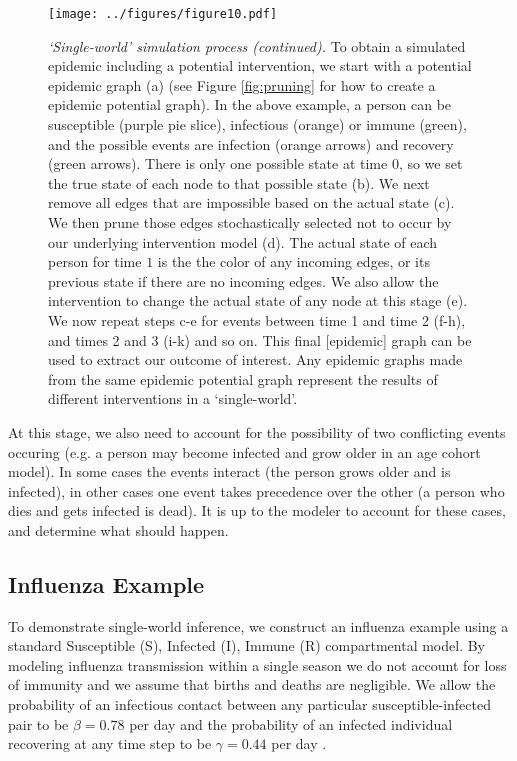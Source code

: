 \documentclass[PTRSB]{rsos}
\makeatletter
\def\checkGraphicsWidth{\ifdim\Gin@nat@width>\linewidth
	\tsGraphicsScaleX\linewidth\else\Gin@nat@width\fi}
\let\ts@includegraphics\includegraphics
\renewcommand{\includegraphics}[1]{\ts@includegraphics[width=\checkGraphicsWidth]{#1}}
\makeatother
\begin{document}
\begin{multicols}{2}
\begin{figure}[hp]
\texttt{[image: ../figures/figure10.pdf]}
\caption{\textit{‘Single-world’ simulation process (continued).}
  To obtain a simulated epidemic including a potential intervention, we start with a potential epidemic graph (a) (see Figure \ref{fig:pruning} for how to create a epidemic potential graph).
  In the above example, a person can be susceptible (purple pie slice), infectious (orange) or immune (green), and the possible events are infection (orange arrows) and recovery (green arrows). %
  There is only one possible state at time $0$, so we set the true state of each node to that possible state (b).
  We next remove all edges that are impossible based on the actual state (c). %
  We then prune those edges stochastically selected not to occur by our underlying intervention model (d).
  The actual state of each person for time $1$ is the the color of any incoming edges, or its previous state if there are no incoming edges.
  We also allow the intervention to change the actual state of any node at this stage (e).
  We now repeat steps c-e for events between time 1 and time 2 (f-h), and times 2 and 3 (i-k) and so on.
  This final [epidemic] graph can be used to extract our outcome of interest.
  Any epidemic graphs made from the same epidemic potential graph represent the results of different interventions in a `single-world'.
}
\label{fig:actualizing}
\end{figure}

At this stage, we also need to account for the possibility of two conflicting events occuring (e.g. a person may become infected and grow older in an age cohort model).
In some cases the events interact (the person grows older and is infected), in other cases one event takes precedence over the other (a person who dies and gets infected is dead).
It is up to the modeler to account for these cases, and determine what should happen.


\subsection*{Influenza Example}
To demonstrate single-world inference, we construct an influenza example using a standard Susceptible (S), Infected (I), Immune (R) compartmental model.
By modeling influenza transmission within a single season we do not account for loss of immunity and we assume that births and deaths are negligible.
We allow the probability of an infectious contact between any particular susceptible-infected pair to be $\beta = 0.78$ per day and the probability of an infected individual recovering at any time step to be $\gamma = 0.44$ per day \cite{forsberg-white-et-al:2009}.


\end{multicols}
\end{document}
